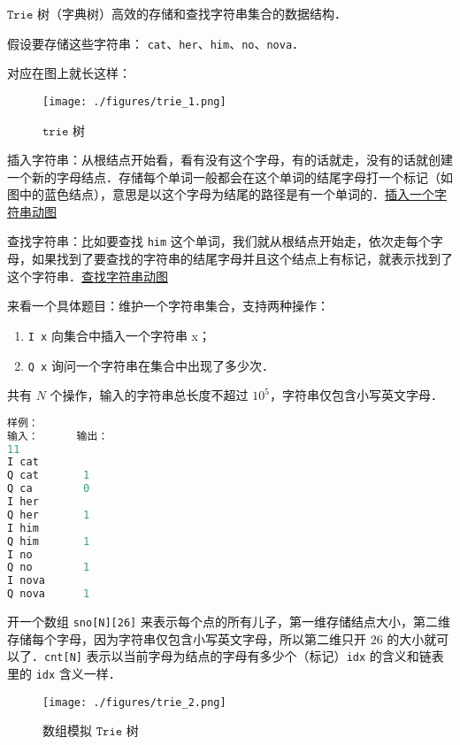 
$\mathtt{Trie}$ 树（字典树）高效的存储和查找字符串集合的数据结构．

假设要存储这些字符串：
\verb|cat|、\verb|her|、\verb|him|、\verb|no|、\verb|nova|．

对应在图上就长这样：\begin{figure}[ht]
\centering
\texttt{[image: ./figures/trie\_1.png]}
\caption{$\mathtt{trie}$ 树} \label{trie_fig1}
\end{figure}

插入字符串：从根结点开始看，看有没有这个字母，有的话就走，没有的话就创建一个新的字母结点．存储每个单词一般都会在这个单词的结尾字母打一个标记（如图中的蓝色结点），意思是以这个字母为结尾的路径是有一个单词的．\href{https://pic2.zhimg.com/v2-cb9b476f3856b7ae68a00af6911c07a9_b.gif}{插入一个字符串动图}

查找字符串：比如要查找 \verb|him| 这个单词，我们就从根结点开始走，依次走每个字母，如果找到了要查找的字符串的结尾字母并且这个结点上有标记，就表示找到了这个字符串．\href{https://pic2.zhimg.com/v2-98c24afcfc74582fdc54c7381d29d639_b.gif}{查找字符串动图}

来看一个具体题目：维护一个字符串集合，支持两种操作：

\begin{enumerate}
\item \verb|I x| 向集合中插入一个字符串 x；
\item \verb|Q x| 询问一个字符串在集合中出现了多少次．
\end{enumerate}
共有 $N$ 个操作，输入的字符串总长度不超过 $10^5$，字符串仅包含小写英文字母．

\begin{lstlisting}[language=cpp]
样例：
输入：      输出：
11
I cat       
Q cat       1
Q ca        0
I her
Q her       1
I him
Q him       1
I no 
Q no        1
I nova
Q nova      1
\end{lstlisting}

开一个数组 \verb|sno[N][26]| 来表示每个点的所有儿子，第一维存储结点大小，第二维存储每个字母，因为字符串仅包含小写英文字母，所以第二维只开 $26$ 的大小就可以了．\verb|cnt[N]| 表示以当前字母为结点的字母有多少个（标记）\verb|idx| 的含义和链表里的 \verb|idx| 含义一样．

\begin{figure}[ht]
\centering
\texttt{[image: ./figures/trie\_2.png]}
\caption{数组模拟 $\mathtt{Trie}$ 树} \label{trie_fig2}
\end{figure}


